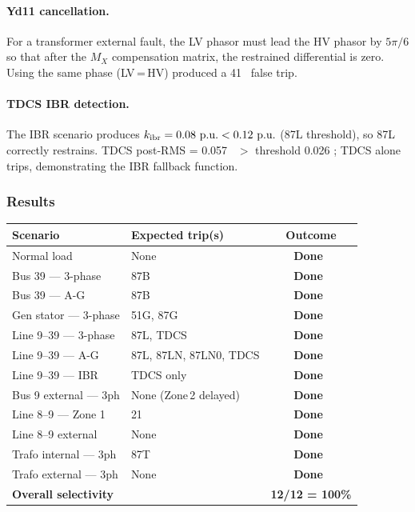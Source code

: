 \documentclass[12pt,a4paper]{article}
\newcommand{\DONE}{\textcolor{passgreen}{\textbf{Done}}}
\newcommand{\pu}{\,\text{p.u.}}
\begin{document}
\paragraph{Yd11 cancellation.}
For a transformer external fault, the LV phasor must lead the HV phasor
by $5\pi/6$ so that after the $M_X$ compensation matrix, the restrained
differential is zero.  Using the same phase (LV\,=\,HV) produced a
41\,\pu\ false trip.

\paragraph{TDCS IBR detection.}
The IBR scenario produces $k_{\rm ibr} = 0.08\,\pu < 0.12\,\pu$ (87L threshold),
so 87L correctly restrains.  TDCS post-RMS = 0.057\,\pu\ $>$ threshold 0.026\,\pu;
TDCS alone trips, demonstrating the IBR fallback function.

\subsubsection{Results}
\begin{center}
\begin{tabular}{llc}
\toprule
Scenario & Expected trip(s) & Outcome \\
\midrule
Normal load           & None                   & \DONE\ \\
Bus 39 — 3-phase      & 87B                    & \DONE\ \\
Bus 39 — A-G          & 87B                    & \DONE\ \\
Gen stator — 3-phase  & 51G, 87G               & \DONE\ \\
Line 9--39 — 3-phase  & 87L, TDCS              & \DONE\ \\
Line 9--39 — A-G      & 87L, 87LN, 87LN0, TDCS & \DONE\ \\
Line 9--39 — IBR      & TDCS only              & \DONE\ \\
Bus 9 external — 3ph  & None (Zone\,2 delayed) & \DONE\ \\
Line 8--9 — Zone 1    & 21                     & \DONE\ \\
Line 8--9 external    & None                   & \DONE\ \\
Trafo internal — 3ph  & 87T                    & \DONE\ \\
Trafo external — 3ph  & None                   & \DONE\ \\
\midrule
\multicolumn{2}{l}{\textbf{Overall selectivity}} & \textbf{12/12 = 100\%} \\
\bottomrule
\end{tabular}
\end{center}
\end{document}
